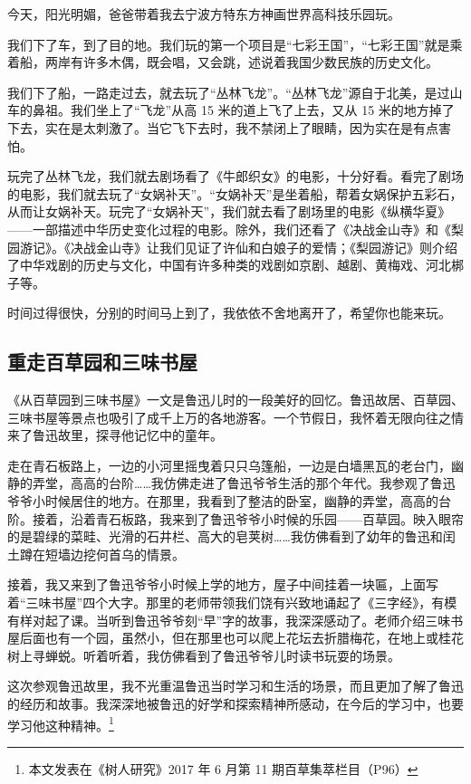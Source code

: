 \documentclass[UTF8,a4paper,titlepage,twoside,10.5pt]{article}
\begin{document}
今天，阳光明媚，爸爸带着我去宁波方特东方神画世界高科技乐园玩。

我们下了车，到了目的地。我们玩的第一个项目是“七彩王国”，“七彩王国”就是乘着船，两岸有许多木偶，既会唱，又会跳，述说着我国少数民族的历史文化。

我们下了船，一路走过去，就去玩了“丛林飞龙”。“丛林飞龙”源自于北美，是过山车的鼻祖。我们坐上了“飞龙”从高 15 米的道上飞了上去，又从 15 米的地方掉了下去，实在是太刺激了。当它飞下去时，我不禁闭上了眼睛，因为实在是有点害怕。

玩完了丛林飞龙，我们就去剧场看了《牛郎织女》的电影，十分好看。看完了剧场的电影，我们就去玩了“女娲补天”。“女娲补天”是坐着船，帮着女娲保护五彩石，从而让女娲补天。玩完了“女娲补天”，我们就去看了剧场里的电影《纵横华夏》——一部描述中华历史变化过程的电影。除外，我们还看了《决战金山寺》和《梨园游记》。《决战金山寺》让我们见证了许仙和白娘子的爱情；《梨园游记》则介绍了中华戏剧的历史与文化，中国有许多种类的戏剧如京剧、越剧、黄梅戏、河北梆子等。

时间过得很快，分别的时间马上到了，我依依不舍地离开了，希望你也能来玩。

\subsection{重走百草园和三味书屋}
\label{sec:org3425714}

《从百草园到三味书屋》一文是鲁迅儿时的一段美好的回忆。鲁迅故居、百草园、三味书屋等景点也吸引了成千上万的各地游客。一个节假日，我怀着无限向往之情来了鲁迅故里，探寻他记忆中的童年。

走在青石板路上，一边的小河里摇曳着只只乌篷船，一边是白墙黑瓦的老台门，幽静的弄堂，高高的台阶……我仿佛走进了鲁迅爷爷生活的那个年代。我参观了鲁迅爷爷小时候居住的地方。在那里，我看到了整洁的卧室，幽静的弄堂，高高的台阶。接着，沿着青石板路，我来到了鲁迅爷爷小时候的乐园——百草园。映入眼帘的是碧绿的菜畦、光滑的石井栏、高大的皂荚树……我仿佛看到了幼年的鲁迅和闰土蹲在短墙边挖何首乌的情景。

接着，我又来到了鲁迅爷爷小时候上学的地方，屋子中间挂着一块匾，上面写着“三味书屋”四个大字。那里的老师带领我们饶有兴致地诵起了《三字经》，有模有样对起了课。当听到鲁迅爷爷刻“早”字的故事，我深深感动了。老师介绍三味书屋后面也有一个园，虽然小，但在那里也可以爬上花坛去折腊梅花，在地上或桂花树上寻蝉蜕。听着听着，我仿佛看到了鲁迅爷爷儿时读书玩耍的场景。

这次参观鲁迅故里，我不光重温鲁迅当时学习和生活的场景，而且更加了解了鲁迅的经历和故事。我深深地被鲁迅的好学和探索精神所感动，在今后的学习中，也要学习他这种精神。\footnote{本文发表在《树人研究》2017 年 6 月第 11 期百草集萃栏目（P96）}
\end{document}
